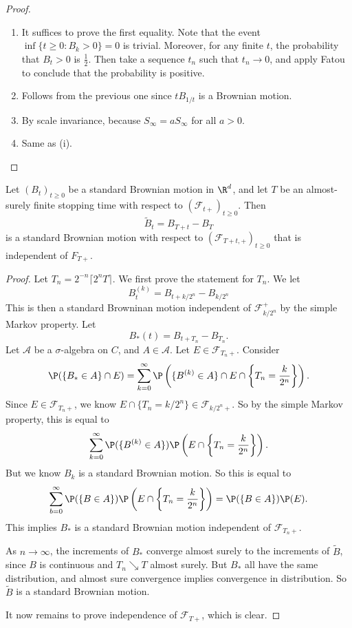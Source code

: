 \documentclass[a4paper]{article}
\begin{document}
\begin{proof}\leavevmode
  \begin{enumerate}
    \item It suffices to prove the first equality. Note that the event $\inf \{t \geq 0: B_k > 0\} = 0$ is trivial. Moreover, for any finite $t$, the probability that $B_t > 0$ is $\frac{1}{2}$. Then take a sequence $t_n$ such that $t_n \to 0$, and apply Fatou to conclude that the probability is positive. %
    \item Follows from the previous one since $t B_{1/t}$ is a Brownian motion.
    \item By scale invariance, because $S_\infty = a S_\infty$ for all $a > 0$.
    \item Same as (i). %
  \end{enumerate}
\end{proof}

\begin{thm}
  Let $(B_t)_{t \geq 0}$ be a standard Brownian motion in $\R^d$, and let $T$ be an almost-surely finite stopping time with respect to $(\mathcal{F}_{t+})_{t \geq 0}$. Then
  \[
    \tilde{B}_t = B_{T + t} - B_T
  \]
  is a standard Brownian motion with respect to $(\mathcal{F}_{T + t, +})_{t \geq 0}$ that is independent of $F_{T+}$. %
\end{thm}

\begin{proof}
  Let $T_n = 2^{-n} \lceil 2^n T \rceil$. We first prove the statement for $T_n$. We let
  \[
    B^{(k)}_t = B_{t + k/2^n} - B_{k/2^n}
  \]
  This is then a standard Browninan motion independent of $\mathcal{F}_{k/2^n}^+$ by the simple Markov property. Let
  \[
    B_*(t) = B_{t + T_n} - B_{T_n}.
  \]
  Let $\mathcal{A}$ be a $\sigma$-algebra on $C$, and $A \in \mathcal{A}$. Let $E \in \mathcal{F}_{T_n +}$. Consider
  \[
    \P(\{B_* \in A\}\cap E) = \sum_{k = 0}^\infty \P\left(\{B^{(k)} \in A\} \cap E \cap \left\{T_n = \frac{k}{2^n}\right\}\right).
  \]
  Since $E \in \mathcal{F}_{T_n+}$, we know $E \cap \{T_n = k/2^n\} \in \mathcal{F}_{k/2^n +}$. So by the simple Markov property, this is equal to
  \[
    \sum_{k = 0}^\infty \P(\{B^{(k)} \in A\}) \P\left(E \cap \left\{T_n = \frac{k}{2^n}\right\}\right).
  \]
  But we know $B_k$ is a standard Brownian motion. So this is equal to
  \[
    \sum_{b = 0}^\infty \P(\{B \in A\}) \P \left(E \cap \left\{ T_n = \frac{k}{2^n}\right\}\right) = \P (\{B \in A\}) \P (E).
  \]
  This implies $B_*$ is a standard Brownian motion independent of $\mathcal{F}_{T_n+}$.

  As $n \to \infty$, the increments of $B_*$ converge almost surely to the increments of $\tilde{B}$, since $B$ is continuous and $T_n \searrow T$ almost surely. But $B_*$ all have the same distribution, and almost sure convergence implies convergence in distribution. So $\tilde{B}$ is a standard Brownian motion.

  It now remains to prove independence of $\mathcal{F}_{T+}$, which is clear.
\end{proof}
\end{document}
